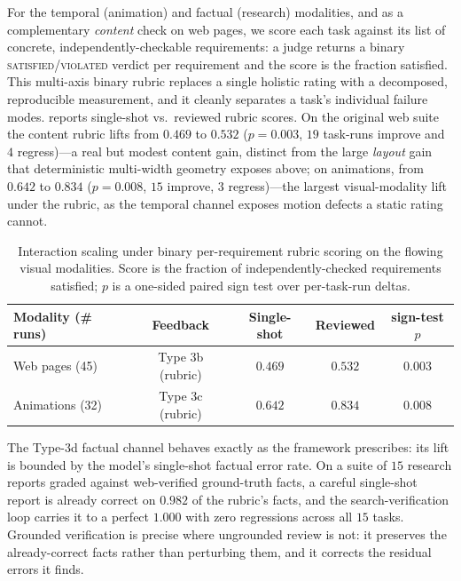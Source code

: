 For the temporal (animation) and factual (research) modalities, and as a
complementary \emph{content} check on web pages, we score each task against its
list of concrete, independently-checkable requirements: a judge returns a binary
\textsc{satisfied}/\textsc{violated} verdict per requirement and the score is the
fraction satisfied. This multi-axis binary rubric replaces a single holistic
rating with a decomposed, reproducible measurement, and it cleanly separates a
task's individual failure modes.  reports single-shot vs.\
reviewed rubric scores. On the original web suite the content rubric lifts from
$0.469$ to $0.532$ ($p=0.003$, $19$ task-runs improve and $4$ regress)---a real
but modest content gain, distinct from the large \emph{layout} gain that
deterministic multi-width geometry exposes above; on animations, from $0.642$ to
$0.834$ ($p=0.008$, $15$ improve, $3$ regress)---the largest visual-modality lift
under the rubric, as the temporal channel exposes motion defects a static rating
cannot.

\begin{table}[t]
  \centering
  \caption{Interaction scaling under binary per-requirement rubric scoring on
  the flowing visual modalities. Score is the fraction of independently-checked
  requirements satisfied; $p$ is a one-sided paired sign test over per-task-run
  deltas.}
  \label{tab:rubric}
  \begin{tabular}{lcccc}
    \toprule
    Modality (\# runs) & Feedback & Single-shot & Reviewed & sign-test $p$ \\
    \midrule
    Web pages (45)   & Type 3b (rubric)        & $0.469$ & $0.532$ & $0.003$ \\
    Animations (32)  & Type 3c (rubric)        & $0.642$ & $0.834$ & $0.008$ \\
    \bottomrule
  \end{tabular}
\end{table}

The Type-3d factual channel behaves exactly as the framework prescribes: its
lift is bounded by the model's single-shot factual error rate. On a suite of
$15$ research reports graded against web-verified ground-truth facts, a careful
single-shot report is already correct on $0.982$ of the rubric's facts, and the
search-verification loop carries it to a perfect $1.000$ with zero regressions
across all $15$ tasks. Grounded verification is precise where ungrounded review
is not: it preserves the already-correct facts rather than perturbing them, and
it corrects the residual errors it finds.

